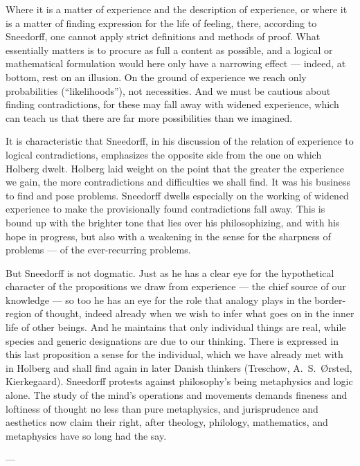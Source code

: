 \documentclass[12pt,a4paper]{book}
\newcommand{\opage}[1]{\marginnote{\footnotesize\textit{[#1]}}}
\begin{document}
Where it is a matter of experience and the description of experience, or where it
is a matter of finding expression for the life of feeling, there, according to
Sneedorff, one cannot apply strict definitions and methods of proof. What
essentially matters is to procure as full a content as possible, and a logical or
mathematical formulation would here only have a narrowing effect --- indeed, at
bottom, rest on an illusion. On the ground of experience we reach only
probabilities (``likelihoods''), not necessities. And we must be cautious about
finding contradictions, for these may fall away with widened experience, which
can teach us that there are far more possibilities than we imagined.

It is characteristic that Sneedorff, in his discussion of the relation of
experience to logical contradictions, emphasizes the opposite side from the one
on which Holberg dwelt. Holberg laid weight on the point that the greater the
experience we gain, the more contradictions and difficulties we shall find. It
was his business to find and pose problems. Sneedorff dwells especially on the
working of widened experience to make the provisionally found contradictions fall
away. This is bound up with the brighter tone that lies over his philosophizing,
and with his hope in progress, but also with a weakening in the sense for the
sharpness of problems --- of the ever-recurring problems.

But Sneedorff is not dogmatic. Just as he has a clear eye for the hypothetical
character of the propositions we draw from experience --- the chief source of our
knowledge --- so too he has an eye for the role that analogy plays in the
border-region of thought, indeed already when we wish to infer what goes on in
the inner life of other beings. And he maintains that only individual things are
real, while species and generic designations are due to our thinking. There is
expressed in this last \opage{19}proposition a sense for the individual, which we have
already met with in Holberg and shall find again in later Danish thinkers
(Treschow, A.\ S.\ Ørsted, Kierkegaard). Sneedorff protests against philosophy's
being metaphysics and logic alone. The study of the mind's operations and
movements demands fineness and loftiness of thought no less than pure
metaphysics, and jurisprudence and aesthetics now claim their right, after
theology, philology, mathematics, and metaphysics have so long had the say.

\begin{center}---\end{center}
\end{document}
